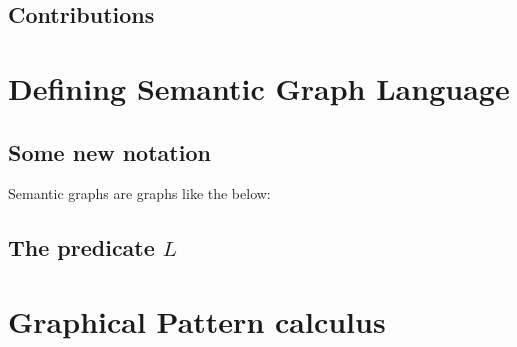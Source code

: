 \documentclass{article}
\begin{document}
\subsection{Contributions}

\section{Defining Semantic Graph Language}

\subsection{Some new notation}

Semantic graphs are graphs like the below:


\subsection{The predicate $L$}

\section{Graphical Pattern calculus}

{}

\end{document}
